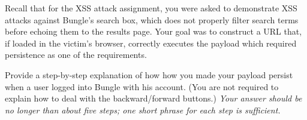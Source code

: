 \eprob

  Recall that for the XSS attack assignment, you were asked to
demonstrate XSS attacks against Bungle’s search box, which does not properly
filter search terms before echoing them to the results page. Your goal was to
construct a URL that, if loaded in the victim’s browser, correctly executes
the payload which required persistence as one of the requirements.

Provide a step-by-step explanation of how how you made your payload persist
when a user logged into Bungle with his account. (You are not required to
explain how to deal with the backward/forward buttons.) {\em Your answer should
be no longer than about five steps; one short phrase for each step is sufficient.}


\eprob
\fi
